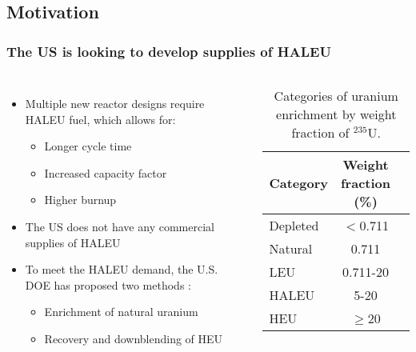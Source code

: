 \subsection{Motivation}
\begin{frame}
    \frametitle{The US is looking to develop supplies of HALEU}
    \begin{columns}
        \column[t]{5cm}
    \begin{itemize}
    \item Multiple new reactor designs require \gls{HALEU} fuel, which allows for: 
    \begin{itemize}
        \item Longer cycle time
        \item Increased capacity factor
        \item Higher burnup 
    \end{itemize}
    \item<2-> The US does not have any commercial supplies of \gls{HALEU}
    \item<3-> To meet the \gls{HALEU} demand, the U.S. \gls{DOE} has proposed two methods \cite{griffith_overview_2020}:
    \begin{itemize}
        \item Enrichment of natural uranium
        \item Recovery and downblending of \gls{HEU}
    \end{itemize}
    
    \end{itemize}

    \column[t]{5cm}
    \begin{table}
        \centering
        \caption{Categories of uranium enrichment by weight fraction of 
        $^{235}$U.}
        \label{tab:enrichemnt}
        \begin{tabular}{l c c}
            \hline
            Category & Weight fraction (\%)\\\hline
            Depleted & $<$0.711 \\
            Natural & 0.711 \\
            LEU & 0.711-20 \\
            \gls{HALEU} & 5-20 \\
            \gls{HEU} & $\ge$20 \\
            \hline
        \end{tabular}
    \end{table}
    \end{columns}
\end{frame}

